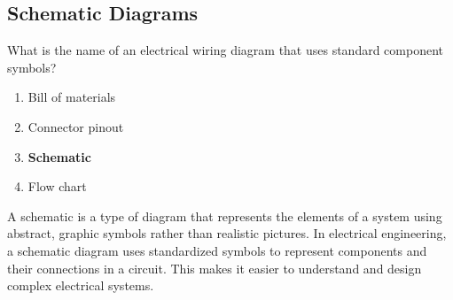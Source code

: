 \subsection{Schematic Diagrams}
\label{T6C01}

\begin{tcolorbox}[colback=gray!10!white,colframe=black!75!black,title=T6C01]
What is the name of an electrical wiring diagram that uses standard component symbols?
\begin{enumerate}[noitemsep]
    \item Bill of materials
    \item Connector pinout
    \item \textbf{Schematic}
    \item Flow chart
\end{enumerate}
\end{tcolorbox}

A schematic is a type of diagram that represents the elements of a system using abstract, graphic symbols rather than realistic pictures. In electrical engineering, a schematic diagram uses standardized symbols to represent components and their connections in a circuit. This makes it easier to understand and design complex electrical systems.